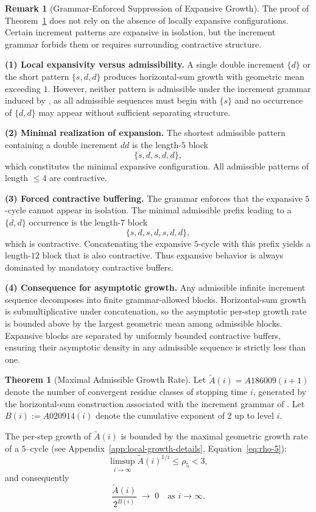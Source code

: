 \documentclass[12pt, oneside]{article}   	%
\numberwithin{equation}{section}          %
\theoremstyle{definition}
\newtheorem{theorem}{Theorem}
\newtheorem*{remark}{Remark}
\begin{document}
\begin{remark}[Grammar-Enforced Suppression of Expansive Growth]
\label{rem:grammar-suppression}
The proof of Theorem~\ref{thm:maximal-growth} does not rely on the absence of
locally expansive configurations. Certain increment patterns are expansive in isolation,
but the increment grammar forbids them or requires surrounding contractive structure.

\medskip
\noindent\textbf{(1) Local expansivity versus admissibility.}
A single double increment $\{d\}$ or the short pattern $\{s,d,d\}$ produces
horizontal-sum growth with geometric mean exceeding $1$. However, neither pattern
is admissible under the increment grammar induced by , as all admissible
sequences must begin with $\{s\}$ and no occurrence of $\{d,d\}$ may appear without
sufficient separating structure.

\medskip
\noindent\textbf{(2) Minimal realization of expansion.}
The shortest admissible pattern containing a double increment $dd$ is
the length-$5$ block
\[
\{s,d,s,d,d\},
\]
which constitutes the minimal expansive configuration. All admissible patterns
of length $\le 4$ are contractive.

\medskip
\noindent\textbf{(3) Forced contractive buffering.}
The grammar enforces that the expansive $5$-cycle cannot appear in isolation. 
The minimal admissible prefix leading to a $\{d,d\}$ occurrence is the length-$7$
block
\[
\{s,d,s,d,s,d,d\},
\]
which is contractive. Concatenating the expansive $5$-cycle with this prefix yields
a length-$12$ block that is also contractive. Thus expansive behavior is always
dominated by mandatory contractive buffers.

\medskip
\noindent\textbf{(4) Consequence for asymptotic growth.}
Any admissible infinite increment sequence decomposes into finite grammar-allowed
blocks. Horizontal-sum growth is submultiplicative under concatenation, so the
asymptotic per-step growth rate is bounded above by the largest geometric mean
among admissible blocks. Expansive blocks are separated by uniformly bounded
contractive buffers, ensuring their asymptotic density in any admissible sequence
is strictly less than one.
\end{remark}

\begin{theorem}[Maximal Admissible Growth Rate]
\label{thm:maximal-growth}
Let $\widetilde A(i) = A186009(i+1)$ denote the number of convergent residue classes
of stopping time $i$, generated by the horizontal-sum construction associated with
the increment grammar of .  Let $B(i) := A020914(i)$ denote the
cumulative exponent of $2$ up to level $i$.  

The per-step growth of $\widetilde A(i)$ is bounded by the maximal geometric growth
rate of a $5$--cycle (see Appendix~\ref{app:local-growth-details}, Equation~\eqref{eq:rho-5}):
\[
\limsup_{i\to\infty} \widetilde A(i)^{1/i} \le \rho_5 < 3,
\]
and consequently
\[
\frac{\widetilde A(i)}{2^{B(i)}} \;\longrightarrow\; 0 \quad \text{as } i\to\infty.
\]
\end{theorem}
\end{document}
